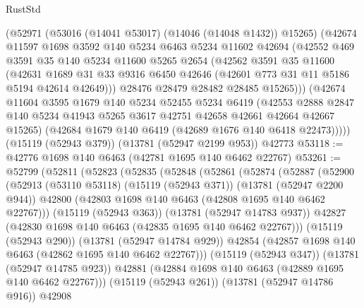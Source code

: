 \begin{lexlean}{RustStd}
\begin{coremodule}
        (@52971
          (@53016 (@14041 @53017) (@14046 (@14048 @1432)) @15265)
          (@42674
            @11597
            @1698
            @3592
            @140
            @5234
            @6463
            @5234
            @11602
            @42694
            (@42552
              @469
              @3591
              @35
              @140
              @5234
              @11600
              @5265
              @2654
              (@42562
                @3591
                @35
                @11600
                (@42631
                  @1689
                  @31
                  @33
                  @9316
                  @6450
                  @42646
                  (@42601 @773 @31 @11 @5186 @5194 @42614 @42649)))
              @28476
              @28479
              @28482
              @28485
              @15265)))
        (@42674
          @11604
          @3595
          @1679
          @140
          @5234
          @52455
          @5234
          @6419
          (@42553
            @2888
            @2847
            @140
            @5234
            @41943
            @5265
            @3617
            @42751
            @42658
            @42661
            @42664
            @42667
            @15265)
          (@42684 @1679 @140 @6419 (@42689 @1676 @140 @6418 @22473)))))
    (@15119 (@52943 @379))
    (@13781 (@52947 @2199 @953))
    @42773
@53118 := @42776 @1698 @140 @6463 (@42781 @1695 @140 @6462 @22767)
@53261 := @52799
    (@52811
      (@52823
        (@52835
          (@52848
            (@52861
              (@52874
                (@52887
                  (@52900
                    (@52913
                      (@53110 @53118)
                      (@15119 (@52943 @371))
                      (@13781 (@52947 @2200 @944))
                      @42800
                      (@42803 @1698 @140 @6463 (@42808 @1695 @140 @6462 @22767)))
                    (@15119 (@52943 @363))
                    (@13781 (@52947 @14783 @937))
                    @42827
                    (@42830 @1698 @140 @6463 (@42835 @1695 @140 @6462 @22767)))
                  (@15119 (@52943 @290))
                  (@13781 (@52947 @14784 @929))
                  @42854
                  (@42857 @1698 @140 @6463 (@42862 @1695 @140 @6462 @22767)))
                (@15119 (@52943 @347))
                (@13781 (@52947 @14785 @923))
                @42881
                (@42884 @1698 @140 @6463 (@42889 @1695 @140 @6462 @22767)))
              (@15119 (@52943 @261))
              (@13781 (@52947 @14786 @916))
              @42908

\end{coremodule}
\end{lexlean}
